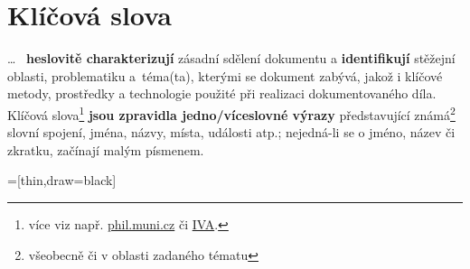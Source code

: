 \documentclass[a4paper,11pt, twoside]{report}
\begin{document}
\vspace{3mm}


\begin{savenotes}
\end{savenotes}

\vspace{-1mm}

\section{Klíčová slova}


\dots
~\textbf{heslovitě charakterizují} zásadní sdělení dokumentu
a 
\textbf{identifikují} stěžejní oblasti, problematiku a~téma(ta),
kterými se dokument zabývá, jakož i klíčové metody, prostředky a technologie použité při realizaci dokumentovaného díla. 
%
Klíčová slova\footnote{více viz např. 
\href{https://kisk.phil.muni.cz/media/3089574/kisk.phil.muni.cz/kpi/temata/definovani-tematu/klicova-slova.html}{phil.muni.cz}
či \href{http://iva.k.utb.cz/lekce/co-jsou-klicova-slova-a-jak-je-tvorit/}{IVA}.
} 
\textbf{jsou 
zpravidla jedno/víceslovné výrazy} představující známá\footnote{všeobecně či v oblasti zadaného tématu} slovní spojení, jména, názvy, místa, události atp.; nejedná-li se o jméno, název či zkratku, začínají malým písmenem.

=[thin,draw=black]

\vspace{4mm}
\end{document}
